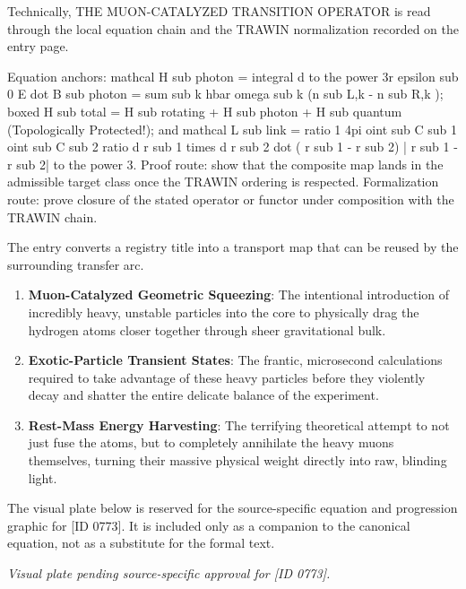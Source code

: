 Technically, THE MUON-CATALYZED TRANSITION OPERATOR is read through the local equation chain and the TRAWIN normalization recorded on the entry page.

Equation anchors: mathcal H sub photon = integral d to the power 3r epsilon sub 0 E dot B sub photon = sum sub k hbar omega sub k (n sub L,k - n sub R,k ); boxed H sub total = H sub rotating + H sub photon + H sub quantum (Topologically Protected!); and mathcal L sub link = ratio 1 4pi oint sub C sub 1 oint sub C sub 2 ratio d r sub 1 times d r sub 2 dot ( r sub 1 - r sub 2) | r sub 1 - r sub 2| to the power 3. Proof route: show that the composite map lands in the admissible target class once the TRAWIN ordering is respected. Formalization route: prove closure of the stated operator or functor under composition with the TRAWIN chain.

The entry converts a registry title into a transport map that can be reused by the surrounding transfer arc.
\endgroup

\begin{enumerate}[leftmargin=1.6em,itemsep=6pt,topsep=4pt]
\item \textbf{Muon-Catalyzed Geometric Squeezing}: The intentional introduction of incredibly heavy, unstable particles into the core to physically drag the hydrogen atoms closer together through sheer gravitational bulk.
\item \textbf{Exotic-Particle Transient States}: The frantic, microsecond calculations required to take advantage of these heavy particles before they violently decay and shatter the entire delicate balance of the experiment.
\item \textbf{Rest-Mass Energy Harvesting}: The terrifying theoretical attempt to not just fuse the atoms, but to completely annihilate the heavy muons themselves, turning their massive physical weight directly into raw, blinding light.
\end{enumerate}

\begingroup\footnotesize\sloppy
The visual plate below is reserved for the source-specific equation and progression graphic for [ID 0773]. It is included only as a companion to the canonical equation, not as a substitute for the formal text.
\par\endgroup
\begingroup\footnotesize\itshape
Visual plate pending source-specific approval for [ID 0773].
\par\endgroup

